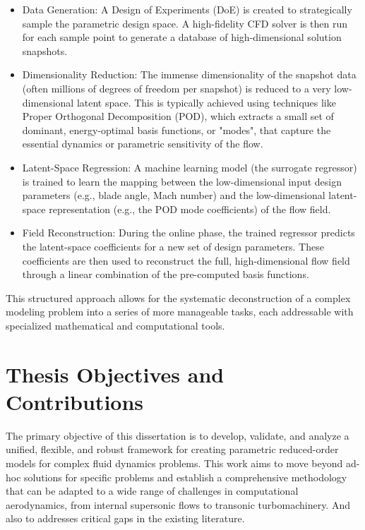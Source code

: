 \documentclass[dsc, EN]{ufabcFHZh}
\begin{document}
\begin{itemize}
    \item Data Generation: A Design of Experiments (DoE) is created to strategically sample the parametric design space. A high-fidelity CFD solver is then run for each sample point to generate a database of high-dimensional solution snapshots.
    \item Dimensionality Reduction: The immense dimensionality of the snapshot data (often millions of degrees of freedom per snapshot) is reduced to a very low-dimensional latent space. This is typically achieved using techniques like Proper Orthogonal Decomposition (POD), which extracts a small set of dominant, energy-optimal basis functions, or "modes", that capture the essential dynamics or parametric sensitivity of the flow.
    \item Latent-Space Regression: A machine learning model (the surrogate regressor) is trained to learn the mapping between the low-dimensional input design parameters (e.g., blade angle, Mach number) and the low-dimensional latent-space representation (e.g., the POD mode coefficients) of the flow field.
    \item Field Reconstruction: During the online phase, the trained regressor predicts the latent-space coefficients for a new set of design parameters. These coefficients are then used to reconstruct the full, high-dimensional flow field through a linear combination of the pre-computed basis functions.
\end{itemize}

This structured approach allows for the systematic deconstruction of a complex modeling problem into a series of more manageable tasks, each addressable with specialized mathematical and computational tools.

\section{Thesis Objectives and Contributions}

The primary objective of this dissertation is to develop, validate, and analyze a unified, flexible, and robust framework for creating parametric reduced-order models for complex fluid dynamics problems. This work aims to move beyond ad-hoc solutions for specific problems and establish a comprehensive methodology that can be adapted to a wide range of challenges in computational aerodynamics, from internal supersonic flows to transonic turbomachinery. And also to addresses critical gaps in the existing literature. 
\end{document}
